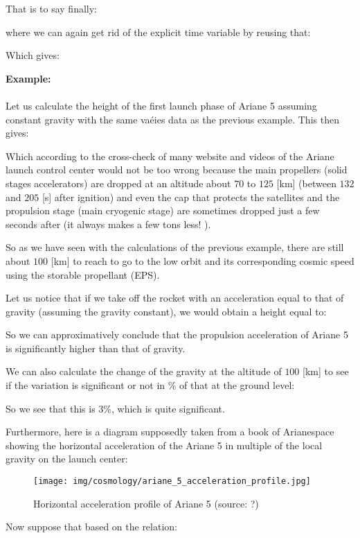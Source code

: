 	That is to say finally:
	
	where we can again get rid of the explicit time variable by reusing that:
	
	Which gives:
	
	\begin{tcolorbox}[colframe=black,colback=white,sharp corners]
	\textbf{{\Large {}}Example:}\\\\
	Let us calculate the height of the first launch phase of Ariane 5 assuming constant gravity with the same vaéies data as the previous example. This then gives:
	
	Which according to the cross-check of many website and videos of the Ariane  launch control center would not be too wrong because the main propellers (solid stages accelerators) are dropped at an altitude about $70$ to $125$ [km] (between $132$ and $205$ [s] after ignition) and even the cap that protects the satellites and the propulsion stage (main cryogenic stage) are sometimes dropped just a few seconds after (it always makes a few tons less! ).
	\end{tcolorbox}
	So as we have seen with the calculations of the previous example, there are still about $100$ [km] to reach to go to the low orbit and its corresponding cosmic speed using the storable propellant (EPS).
	
	Let us notice that if we take off the rocket with an acceleration equal to that of gravity (assuming the gravity constant), we would obtain a height equal to:
	
	So we can approximatively conclude that the propulsion acceleration of Ariane 5 is significantly higher than that of gravity.
	
	We can also calculate the change of the gravity at the altitude of $100$ [km] to see if the variation is significant or not in $\%$ of that at the ground level:
	
	So we see that this is $3\%$, which is quite significant.
	
	Furthermore, here is a diagram supposedly taken from a book of Arianespace showing the horizontal acceleration of the Ariane 5 in multiple of the local gravity on the launch center:
	\begin{figure}[H]
		\centering
		\texttt{[image: img/cosmology/ariane\_5\_acceleration\_profile.jpg]}
		\caption[Horizontal acceleration profile of Ariane 5]{Horizontal acceleration profile of Ariane 5 (source: ?)}
	\end{figure}
	Now suppose that based on the relation:
	
